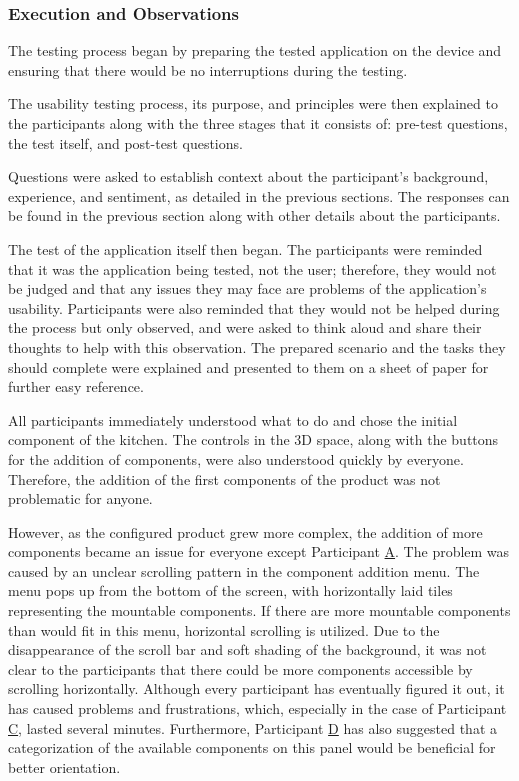 \subsubsection{Execution and Observations}

The testing process began by preparing the tested application on the device and ensuring that there would be no interruptions during the testing.

The usability testing process, its purpose, and principles were then explained to the participants along with the three stages that it consists of: pre-test questions, the test itself, and post-test questions.

Questions were asked to establish context about the participant's background, experience, and sentiment, as detailed in the previous sections. The responses can be found in the previous section along with other details about the participants.

The test of the application itself then began. The participants were reminded that it was the application being tested, not the user; therefore, they would not be judged and that any issues they may face are problems of the application's usability. Participants were also reminded that they would not be helped during the process but only observed, and were asked to think aloud and share their thoughts to help with this observation. The prepared scenario and the tasks they should complete were explained and presented to them on a sheet of paper for further easy reference. 

All participants immediately understood what to do and chose the initial component of the kitchen. The controls in the 3D space, along with the buttons for the addition of components, were also understood quickly by everyone. Therefore, the addition of the first components of the product was not problematic for anyone. 

However, as the configured product grew more complex, the addition of more components became an issue for everyone except Participant \hyperref[itm:A]{A}. The problem was caused by an unclear scrolling pattern in the component addition menu. The menu pops up from the bottom of the screen, with horizontally laid tiles representing the mountable components. If there are more mountable components than would fit in this menu, horizontal scrolling is utilized. Due to the disappearance of the scroll bar and soft shading of the background, it was not clear to the participants that there could be more components accessible by scrolling horizontally. Although every participant has eventually figured it out, it has caused problems and frustrations, which, especially in the case of Participant \hyperref[itm:C]{C}, lasted several minutes. Furthermore, Participant \hyperref[itm:D]{D} has also suggested that a categorization of the available components on this panel would be beneficial for better orientation. 

